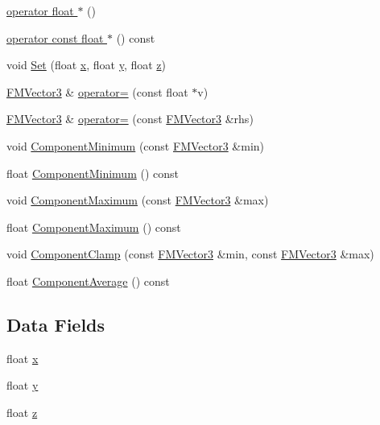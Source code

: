 \begin{DoxyCompactItemize}
\hyperlink{classFMVector3_a767d55b848c49e297cd683ca961fe138}{operator float $\ast$} ()
\item 
\hyperlink{classFMVector3_aa293da50dcc86b53884296e2ac8ca578}{operator const float $\ast$} () const 
\item 
void \hyperlink{classFMVector3_a9e59e251faad4951e50db8f04b7b8481}{Set} (float \hyperlink{classFMVector3_ab31613614892bba88807d31b2c9ee87e}{x}, float \hyperlink{classFMVector3_a6e8a45596a095d86205557d7231ef973}{y}, float \hyperlink{classFMVector3_ad912906661058ab718fb887ad67f5ad4}{z})
\item 
\hyperlink{classFMVector3}{FMVector3} \& \hyperlink{classFMVector3_a8b02f3c679758d31f1c5208c954cdbb9}{operator=} (const float $\ast$v)
\item 
\hyperlink{classFMVector3}{FMVector3} \& \hyperlink{classFMVector3_a4732a6439ff955252445b45b054ee0bb}{operator=} (const \hyperlink{classFMVector3}{FMVector3} \&rhs)
\item 
void \hyperlink{classFMVector3_a7ec4ab34895012f156add04613322c82}{ComponentMinimum} (const \hyperlink{classFMVector3}{FMVector3} \&min)
\item 
float \hyperlink{classFMVector3_a90460eb75019e378d47d7fbdbb754398}{ComponentMinimum} () const 
\item 
void \hyperlink{classFMVector3_a8682b0a239be2b72b85c3ff43b30d9e2}{ComponentMaximum} (const \hyperlink{classFMVector3}{FMVector3} \&max)
\item 
float \hyperlink{classFMVector3_a5f3b1065cb7615be6016be00ec6d5d49}{ComponentMaximum} () const 
\item 
void \hyperlink{classFMVector3_a0bbd056f588ca19bcaec3b4b92ff8351}{ComponentClamp} (const \hyperlink{classFMVector3}{FMVector3} \&min, const \hyperlink{classFMVector3}{FMVector3} \&max)
\item 
float \hyperlink{classFMVector3_a370f45ad1365232180b34d6eec7d3f0e}{ComponentAverage} () const 
\end{DoxyCompactItemize}
\subsection*{Data Fields}
\begin{DoxyCompactItemize}
\item 
float \hyperlink{classFMVector3_ab31613614892bba88807d31b2c9ee87e}{x}
\item 
float \hyperlink{classFMVector3_a6e8a45596a095d86205557d7231ef973}{y}
\item 
float \hyperlink{classFMVector3_ad912906661058ab718fb887ad67f5ad4}{z}
\end{DoxyCompactItemize}
